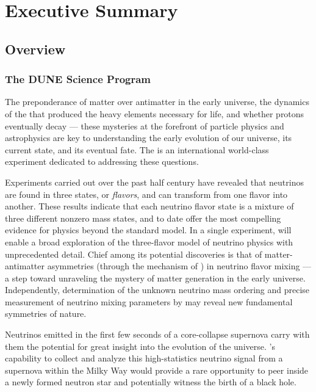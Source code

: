 \chapter{Executive Summary}
\label{ch:exec-overall}

\section{Overview}
\label{sec:exec-overall-1}

\subsection{The DUNE Science Program}
\label{sec:exec-overall-sci}

The preponderance of matter over antimatter in the early universe, the dynamics of the  that produced the heavy elements necessary for life, and whether protons eventually decay --- these mysteries at the forefront of particle physics and astrophysics are key to understanding the early evolution of our universe, its current state, and its eventual fate. The  is an international world-class experiment dedicated to addressing these questions.

Experiments carried out over the past half century have revealed that neutrinos are found in three states, or \textit{flavors}, and can transform from one flavor into another. These results indicate that each neutrino flavor state is a mixture of three different nonzero mass states, and to date offer the most compelling evidence for physics beyond the standard model. In a single experiment,  will enable a broad exploration of the three-flavor model of neutrino physics with unprecedented detail. Chief among its potential discoveries is that of matter-antimatter asymmetries (through the mechanism of ) in neutrino flavor mixing --- a step toward
unraveling the mystery of matter generation in the early universe. Independently, determination of the unknown neutrino mass ordering and precise measurement of neutrino mixing parameters by  may reveal new fundamental symmetries of nature.

Neutrinos emitted in the first few seconds of a core-collapse supernova carry with them the potential for great insight into the evolution of the universe. 's capability to collect and analyze this high-statistics neutrino signal from a supernova within the Milky Way would provide a rare opportunity to peer inside a newly formed neutron star and potentially witness the birth of a black hole.

